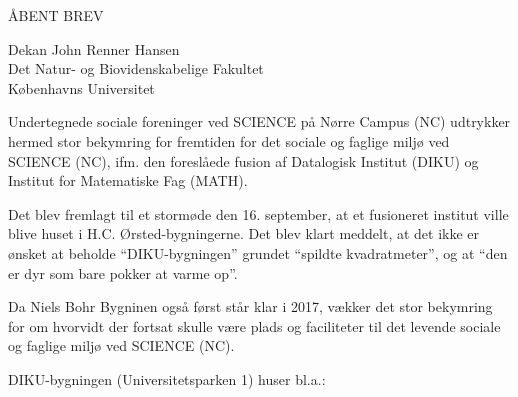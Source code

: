 \documentclass[a4paper]{article}
\begin{document}
ÅBENT BREV

Dekan John Renner Hansen \\
Det Natur- og Biovidenskabelige Fakultet \\
Københavns Universitet

Undertegnede sociale foreninger ved SCIENCE på Nørre Campus (NC) udtrykker
hermed stor bekymring for fremtiden for det sociale og faglige miljø ved
SCIENCE (NC), ifm. den foreslåede fusion af Datalogisk Institut (DIKU) og
Institut for Matematiske Fag (MATH).

Det blev fremlagt til et stormøde den 16. september, at et fusioneret institut
ville blive huset i H.C. Ørsted-bygningerne. Det blev klart meddelt, at det
ikke er ønsket at beholde ``DIKU-bygningen'' grundet ``spildte kvadratmeter'',
og at ``den er dyr som bare pokker at varme op''.

Da Niels Bohr Bygninen også først står klar i 2017, vækker det stor
bekymring for om hvorvidt der fortsat skulle være plads og faciliteter
til det levende sociale og faglige miljø ved SCIENCE (NC).

DIKU-bygningen (Universitetsparken 1) huser bl.a.:
\end{document}
